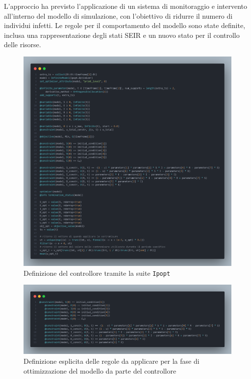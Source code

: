 L'approccio ha previsto l'applicazione di un sistema di 
monitoraggio e intervento all'interno del modello di simulazione, 
con l'obiettivo di ridurre il numero di individui infetti. 
Le regole per il comportamento del modello sono state definite, 
inclusa una rappresentazione degli stati SEIR e un nuovo stato per 
il controllo delle risorse.

\begin{figure}[H]
	\begin{center}
		\includegraphics[width=\textwidth]{img/controller_ipopt.png}
		\caption{Definizione del controllore tramite la suite \texttt{Ipopt}}
		\label{fig:controller_ipopt}	
    \end{center}
\end{figure}

\begin{figure}[H]
	\begin{center}
		\includegraphics[width=\textwidth]{img/controller_rules.png}
		\caption{Definizione esplicita delle regole da applicare per la fase di ottimizzazione del modello da parte del controllore}
		\label{fig:controller_rules}	
    \end{center}
\end{figure}

